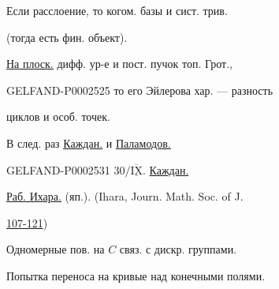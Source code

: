 Если расслоение, то когом. базы и сист. трив.

(тогда есть фин. объект).





\underline{\underline{На плоск.}} дифф. ур-е и пост. пучок топ. Грот.,





\begin{GelfandAdjacentEvidence}{GELFAND-P000252}{5}
то его Эйлерова хар. — разность 

 циклов и особ. точек.
\end{GelfandAdjacentEvidence}





В след. раз \underline{\underline{Каждан.}} и \underline{\underline{Паламодов.}}







\begin{GelfandAdjacentEvidence}{GELFAND-P000253}{1}
$30/\underline{\overline{\mathrm{IX}}}$. \underline{Каждан.}





\underline{Раб. Ихара.} (яп.). (Ihara, Journ. Math. Soc. of J.




\underline{107-121})
\end{GelfandAdjacentEvidence}





Одномерные пов. на $C$ связ. с дискр. группами.

Попытка переноса на кривые над конечными полями.





